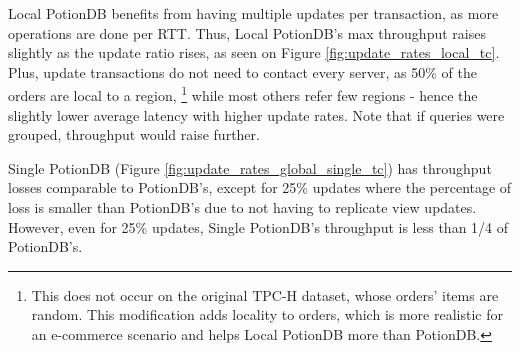\documentclass[sigconf, nonacm]{acmart}
\begin{document}
Local PotionDB benefits from having multiple updates per transaction, as more operations are done per RTT.
Thus, Local PotionDB's max throughput raises slightly as the update ratio rises, as seen on Figure \ref{fig:update_rates_local_tc}.
Plus, update transactions do not need to contact every server, as 50\% of the orders are local to a region, \footnote{This does not occur on the original TPC-H dataset, whose orders' items are random. This modification adds locality to orders, which is more realistic for an e-commerce scenario and helps Local PotionDB more than PotionDB.
} while most others refer few regions - hence the slightly lower average latency with higher update rates.
Note that if queries were grouped, throughput would raise further.

Single PotionDB (Figure \ref{fig:update_rates_global_single_tc}) has throughput losses comparable to PotionDB's, except for 25\% updates where the percentage of loss is smaller than PotionDB's due to not having to replicate view updates.
However, even for 25\% updates, Single PotionDB's throughput is less than 1/4 of PotionDB's.
\end{document}
